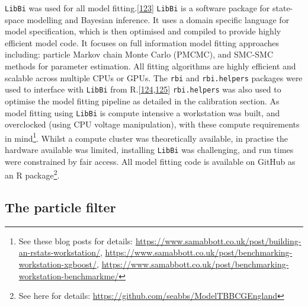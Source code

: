 \documentclass[11pt,twoside]{bristolthesis}
\begin{document}
  \texttt{LibBi} was used for all model fitting.{[}\protect\hyperlink{ref-Murray2015}{123}{]} \texttt{LibBi} is a software package for state-space modelling and Bayesian inference. It uses a domain specific language for model specification, which is then optimised and compiled to provide highly efficient model code. It focuses on full information model fitting approaches including: particle Markov chain Monte Carlo (PMCMC), and SMC-SMC methods for parameter estimation. All fitting algorithms are highly efficient and scalable across multiple CPUs or GPUs. The \texttt{rbi} and \texttt{rbi.helpers} packages were used to interface with \texttt{LibBi} from R.{[}\protect\hyperlink{ref-Funk:2019ud}{124},\protect\hyperlink{ref-Funk:2019uw}{125}{]} \texttt{rbi.helpers} was also used to optimise the model fitting pipeline as detailed in the calibration section. As model fitting using \texttt{LibBi} is compute intensive a workstation was built, and overclocked (using CPU voltage manipulation), with these compute requirements in mind\footnote{See these blog posts for details: \url{https://www.samabbott.co.uk/post/building-an-rstats-workstation/}, \url{https://www.samabbott.co.uk/post/benchmarking-workstation-xgboost/}, \url{https://www.samabbott.co.uk/post/benchmarking-workstation-benchmarkme/}}. Whilst a compute cluster was theoretically available, in practise the hardware available was limited, installing \texttt{LibBi} was challenging, and run times were constrained by fair access. All model fitting code is available on GitHub as an R package\footnote{See here for details: \url{https://github.com/seabbs/ModelTBBCGEngland}}.
  
  \hypertarget{particle-filter}{%
  \subsection{The particle filter}\label{particle-filter}}
  
\end{document}
